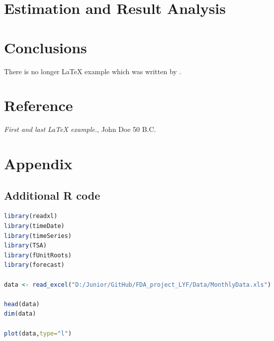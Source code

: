 \documentclass[12pt, a4paper, titlepage]{article}
\begin{document}
\section{Estimation and Result Analysis}

\section{Conclusions}\label{conclusions}
There is no longer \LaTeX{} example which was written by \cite{doe}.

\section{Reference}
\begin{thebibliography}{9}
 \emph{First and last \LaTeX{} example.},
John Doe 50 B.C. 
\end{thebibliography}

\section{Appendix}
\subsection{Additional R code}
\begin{lstlisting}[language=R] 
library(readxl)
library(timeDate)
library(timeSeries)
library(TSA)
library(fUnitRoots)
library(forecast)

data <- read_excel("D:/Junior/GitHub/FDA_project_LYF/Data/MonthlyData.xls")

head(data)
dim(data)

plot(data,type="l")
\end{lstlisting}
\end{document}

